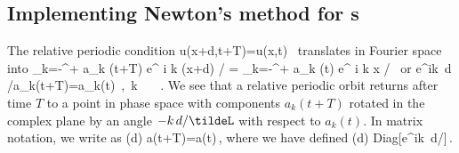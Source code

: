   

\subsection{Implementing Newton's method  for \rpo s}
\label{sec:NewtRPOs}

The relative periodic condition
\beq
	u(x+d,t+T)=u(x,t) \,
\eeq
translates in Fourier space into
\beq	
	\sum_{k=-\infty}^{+\infty} a_k (t+T) e^{ i k (x+d) / \tildeL} 
		= \sum_{k=-\infty}^{+\infty} a_k (t) e^{ i k x / \tildeL} \,
\eeq
or
\beq
	e^{ik\, d /\tildeL}a_k(t+T)=a_k(t) \,,\ \forall k \in {}\ \ \ .
	\label{eq:RPOcondition}
\eeq
We see that a relative periodic orbit returns after time $T$ to a point in 
phase space with components $a_k(t+T)$ rotated in the complex plane by an 
angle $-k\, d /\tildeL$ with respect to $a_k(t)$. In matrix notation, we write  as
\beq
	(d)  a(t+T)=a(t)\,,
	\label{eq:RPO}
\eeq
where we have defined
\beq
	(d) \equiv \mbox{Diag}[e^{ik\, d/\tildeL}]\,.
\eeq

